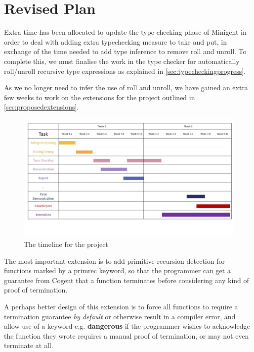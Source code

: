 \chapter{Revised Plan}
\label{ch:plan}

Extra time has been allocated to update the type checking phase of Minigent in order to deal with
adding extra typechecking measure to \textsf{take} and \textsf{put}, in exchange of the time
needed to add type inference to remove \textsf{roll} and \textsf{unroll}. To complete this,
we must finalise the work in the type checker for automatically \textsf{roll}/\textsf{unroll} recursive type expressions
as explained in \autoref{sec:typecheckingprogress}.

As we no longer need to infer the use of \textsf{roll} and \textsf{unroll}, we have gained an extra
few weeks to work on the extensions for the project outlined in \autoref{sec:proposedextensions}.

\begin{figure}
    \centering
    \includegraphics[height=0.50\textheight, angle=90]{content/revised_plan.jpg}
    \caption{The timeline for the project}
    \label{fig:revisedplan}
\end{figure}

The most important extension is to add primitive recursion detection for functions marked by
a \textsf{primrec} keyword, so that the programmer can get a guarantee from Cogent that
a function terminates before considering any kind of proof of termination.

A perhaps better design of this extension is to force all functions to require a termination guarantee
\textit{by default} or otherwise result in a compiler error, and allow use of a keyword e.g. \textbf{dangerous}
if the programmer wishes to acknowledge the function they wrote requires a manual proof of termination, or
may not even terminate at all.

